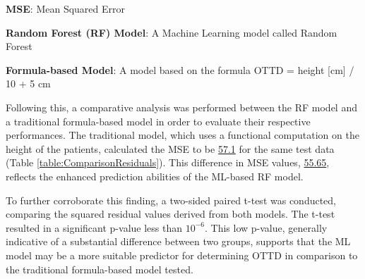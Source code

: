 \documentclass[11pt]{article}
\begin{document}
\begin{table}[h]
\caption{\protect\hyperlink{file-table-1-pkl}{Comparison of Mean Squared Errors (MSE) between RandomForest (ML) model and Formula-based model}}
\label{table:ComparisonResiduals}
\begin{threeparttable}
\renewcommand{\TPTminimum}{\linewidth}
\begin{tablenotes}
\footnotesize
\item \textbf{MSE}: Mean Squared Error
\item \textbf{Random Forest (RF) Model}: A Machine Learning model called Random Forest
\item \textbf{Formula-based Model}: A model based on the formula OTTD = height [cm] / 10 + 5 cm
\end{tablenotes}
\end{threeparttable}
\end{table}


Following this, a comparative analysis was performed between the RF model and a traditional formula-based model in order to evaluate their respective performances. The traditional model, which uses a functional computation on the height of the patients, calculated the MSE to be \hyperlink{A2a}{57.1} for the same test data (Table \ref{table:ComparisonResiduals}). This difference in MSE values, \hyperlink{results0}{55.65}, reflects the enhanced prediction abilities of the ML-based RF model.

To further corroborate this finding, a two-sided paired t-test was conducted, comparing the squared residual values derived from both models. The t-test resulted in a significant p-value less than \hyperlink{R3a}{$10^{-6}$}. This low p-value, generally indicative of a substantial difference between two groups, supports that the ML model may be a more suitable predictor for determining OTTD in comparison to the traditional formula-based model tested.
\end{document}
